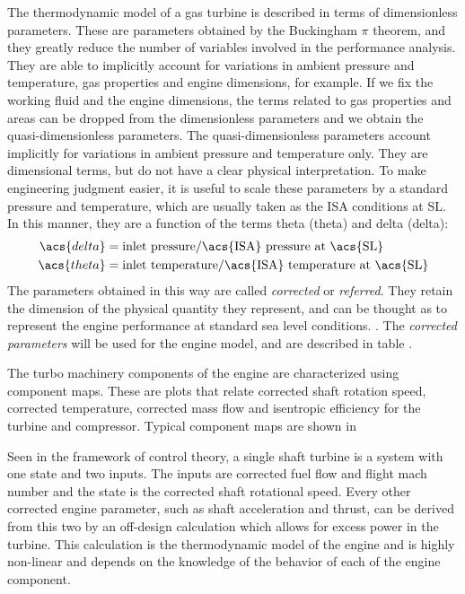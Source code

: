 The thermodynamic model of a gas turbine is described in terms of dimensionless parameters.%
These are parameters obtained by the Buckingham $\pi$ theorem, 
 and they greatly reduce the number of variables involved in the performance analysis.
 They are able to implicitly account for variations in ambient pressure and temperature, 
 gas properties and engine dimensions, for example.
If we fix the working fluid and the engine dimensions, the terms related to gas properties and areas can be dropped from the dimensionless parameters and we obtain the quasi-dimensionless parameters.
The quasi-dimensionless parameters account implicitly for variations in ambient pressure and temperature only.
They are dimensional terms, but do not have a clear physical interpretation. 
To make engineering judgment easier, it is useful to scale these parameters by 
 a standard pressure and temperature, which are usually taken as the 
 \gls{ISA} conditions at \gls{SL}. 
In this manner, they are a function of the terms theta (\acs{theta}) and delta (\acs{delta}):
\begin{align}
    \acs{delta} &= \text{inlet pressure}/\text{\acs{ISA} pressure at \acs{SL}} \\
    \acs{theta} &= \text{inlet temperature}/\text{\acs{ISA} temperature at \acs{SL}}
\end{align}
The parameters obtained in this way are called \emph{corrected} or \emph{referred}.
They retain the dimension of the physical quantity they represent, 
 and can be thought as to represent the engine performance at standard sea level conditions.
\cite{walsh2004gas}. 
The \emph{corrected parameters} will be used for the engine model,
 and are described in table .
 
The turbo machinery components of the engine are characterized using component maps.%
 These are plots that relate corrected shaft rotation speed, corrected temperature,
 corrected mass flow and isentropic efficiency for the turbine and compressor.
Typical component maps are shown in 

Seen in the framework of control theory,
 a single shaft turbine is a system with one state and two inputs.
 The inputs are corrected fuel flow and flight mach number 
 and the state is the corrected shaft rotational speed.
 Every other corrected engine parameter, such as shaft acceleration and thrust,
 can be derived from this two by an off-design calculation
 which allows for excess power in the turbine.
This calculation is the thermodynamic model of the engine and is highly non-linear and depends on the knowledge of the behavior of each of the engine component.

